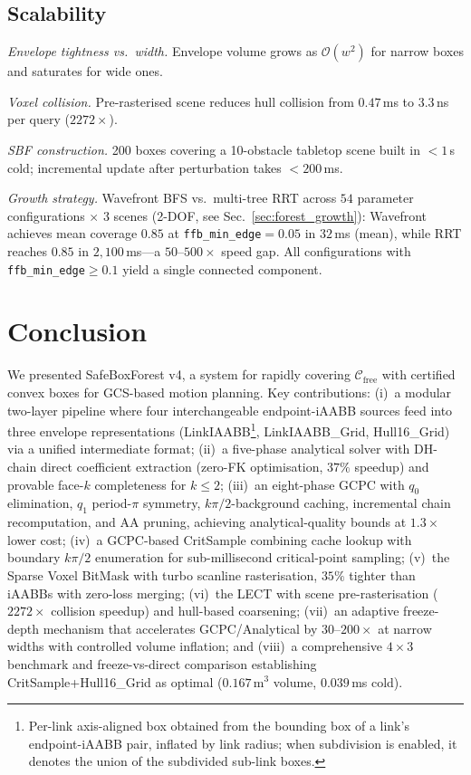 \documentclass[journal]{IEEEtran}
\newcommand{\Cfree}{\mathcal{C}_\text{free}}
\newcommand{\calO}{\mathcal{O}}
\newcommand{\LinkIAABBDef}{Per-link axis-aligned box obtained from the bounding box of a link's endpoint-iAABB pair, inflated by link radius; when subdivision is enabled, it denotes the union of the subdivided sub-link boxes.}
\begin{document}
\subsection{Scalability}\label{sec:exp_scalability}

\emph{Envelope tightness vs.\ width.}
Envelope volume grows as $\calO(w^2)$ for narrow boxes
and saturates for wide ones.

\emph{Voxel collision.}
Pre-rasterised scene reduces hull collision from $0.47$\,ms
to $3.3$\,ns per query ($2272{\times}$).

\emph{SBF construction.}
200 boxes covering a 10-obstacle tabletop scene built in
$<\!1$\,s cold; incremental update after perturbation
takes $<\!200$\,ms.

\emph{Growth strategy.}
Wavefront BFS vs.\ multi-tree RRT across
$54$ parameter configurations $\times$ $3$ scenes
(2-DOF, see Sec.~\ref{sec:forest_growth}):
Wavefront achieves mean coverage $0.85$ at \texttt{ffb\_min\_edge}${}=0.05$
in $32$\,ms (mean), while RRT reaches $0.85$ in $2{,}100$\,ms---a
$50$--$500{\times}$ speed gap.
All configurations with \texttt{ffb\_min\_edge}${} \geq 0.1$ yield
a single connected component.

\section{Conclusion}\label{sec:conclusion}

We presented SafeBoxForest v4, a system for rapidly covering
$\Cfree$ with certified convex boxes for GCS-based motion planning.
Key contributions:
(i)~a modular two-layer pipeline where four interchangeable
endpoint-iAABB sources feed into three envelope representations
(LinkIAABB\footnote{\LinkIAABBDef}, LinkIAABB\_Grid, Hull16\_Grid)
via a unified intermediate format;
(ii)~a five-phase analytical solver with DH-chain direct
coefficient extraction (zero-FK optimisation, $37\%$ speedup)
and provable face-$k$ completeness for $k \leq 2$;
(iii)~an eight-phase GCPC with $q_0$ elimination, $q_1$ period-$\pi$
symmetry, $k\pi/2$-background caching, incremental chain
recomputation, and AA pruning, achieving analytical-quality bounds at
$1.3{\times}$ lower cost;
(iv)~a GCPC-based CritSample combining cache lookup with boundary
$k\pi/2$ enumeration for sub-millisecond critical-point sampling;
(v)~the Sparse Voxel BitMask with turbo scanline rasterisation,
$35\%$ tighter than iAABBs with zero-loss merging;
(vi)~the LECT with scene pre-rasterisation ($2272{\times}$ collision
speedup) and hull-based coarsening;
(vii)~an adaptive freeze-depth mechanism that
accelerates GCPC/Analytical by $30$--$200{\times}$
at narrow widths with controlled volume inflation; and
(viii)~a comprehensive $4{\times}3$ benchmark and freeze-vs-direct
comparison establishing
CritSample+Hull16\_Grid as optimal
($0.167$\,m$^3$ volume, $0.039$\,ms cold).
\end{document}
